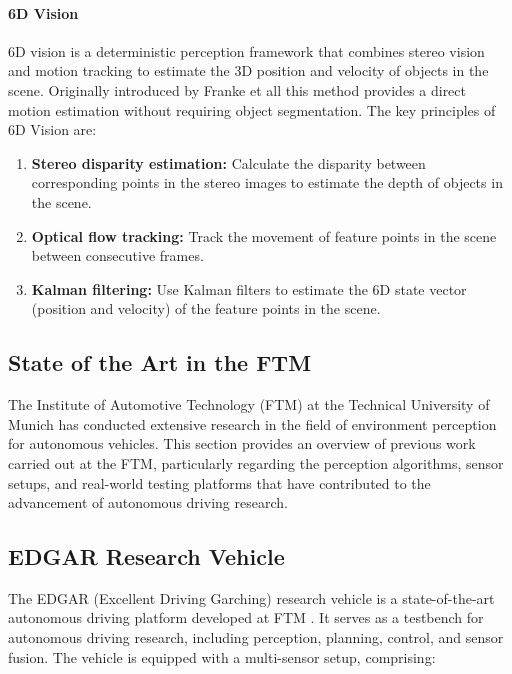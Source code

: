 \paragraph{6D Vision}

6D vision is a deterministic perception framework that combines stereo vision and motion tracking to estimate the 3D position and velocity
of objects in the scene. Originally introduced by Franke et all \cite{6d_vision_daimler} this method provides a direct
motion estimation without requiring object segmentation. The key principles of 6D Vision are: 

\begin{enumerate}
  \item \textbf{Stereo disparity estimation:} Calculate the disparity between corresponding points in the stereo images to estimate the depth of objects in the scene.
  \item \textbf{Optical flow tracking:} Track the movement of feature points in the scene between consecutive frames.
  \item \textbf{Kalman filtering:} Use Kalman filters to estimate the 6D state vector (position and velocity) of the feature points in the scene.
\end{enumerate}




\subsection{State of the Art in the FTM}

The Institute of Automotive Technology (FTM) at the Technical University of Munich has conducted extensive research in
 the field of environment perception for autonomous vehicles. This section provides an overview of previous work carried 
 out at the FTM, particularly regarding the perception algorithms, sensor setups, and real-world testing platforms that 
 have contributed to the advancement of autonomous driving research.

\subsection{EDGAR Research Vehicle}

The EDGAR (Excellent Driving Garching) research vehicle is a state-of-the-art autonomous driving platform 
developed at FTM \cite{edgar_hardware}. It serves as a testbench for autonomous driving research, including perception, planning, control, 
and sensor fusion. The vehicle is equipped with a multi-sensor setup, comprising:


